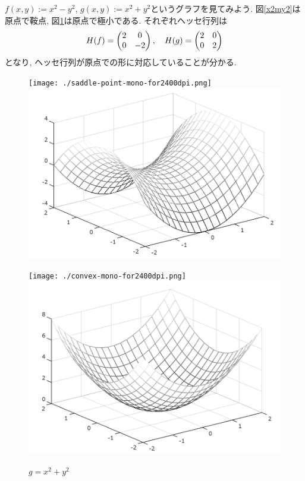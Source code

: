 $f(x,y):=x^2-y^2$, $g(x,y):=x^2+y^2$というグラフを見てみよう.
図\ref{x2my2}は原点で鞍点, 図\ref{x2py2}は原点で極小である.
それぞれヘッセ行列は
$$
H(f)=\begin{pmatrix} 2 & 0 \\ 0 & -2 \end{pmatrix}, \quad H(g)=\begin{pmatrix} 2 & 0 \\ 0 & 2 \end{pmatrix}
$$
となり, ヘッセ行列が原点での形に対応していることが分かる.
\begin{figure}[ht]
 \begin{minipage}{0.48\hsize}
  \centering
  {\texttt{[image: ./saddle-point-mono-for2400dpi.png]}}
  {\includegraphics[scale=0.25]{./saddle-point-mono.png}}
  \caption{$f=x^2-y^2$}
  \label{x2my2}
 \end{minipage}
 \begin{minipage}{0.48\hsize}
  \centering
  {\texttt{[image: ./convex-mono-for2400dpi.png]}}
  {\includegraphics[scale=0.25]{./convex-mono.png}}
  \caption{$g=x^2+y^2$}
  \label{x2py2}
 \end{minipage}
\end{figure}
\vspace{0pt}

